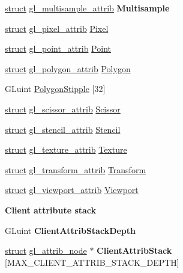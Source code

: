\begin{Indent}
\begin{DoxyCompactItemize}
\hyperlink{interfacestruct}{struct} \hyperlink{structgl__multisample__attrib}{gl\+\_\+multisample\+\_\+attrib} {\bfseries Multisample}
\item 
\hyperlink{interfacestruct}{struct} \hyperlink{structgl__pixel__attrib}{gl\+\_\+pixel\+\_\+attrib} \hyperlink{structgl__context_ac718578bc209874cb788abf0c41980ac}{Pixel}
\item 
\hyperlink{interfacestruct}{struct} \hyperlink{structgl__point__attrib}{gl\+\_\+point\+\_\+attrib} \hyperlink{structgl__context_a79d8f2f5bb031562f2136478c55fc249}{Point}
\item 
\hyperlink{interfacestruct}{struct} \hyperlink{structgl__polygon__attrib}{gl\+\_\+polygon\+\_\+attrib} \hyperlink{structgl__context_a49528675fd9c10af309a499891392aa4}{Polygon}
\item 
G\+Luint \hyperlink{structgl__context_af3af2af1154e6b8670f8d5076e299095}{Polygon\+Stipple} \mbox{[}32\mbox{]}
\item 
\hyperlink{interfacestruct}{struct} \hyperlink{structgl__scissor__attrib}{gl\+\_\+scissor\+\_\+attrib} \hyperlink{structgl__context_a8062e89ef2d80346927dfdba1147f3a0}{Scissor}
\item 
\hyperlink{interfacestruct}{struct} \hyperlink{structgl__stencil__attrib}{gl\+\_\+stencil\+\_\+attrib} \hyperlink{structgl__context_a95a893f6eb0f3b7a23d89db3b0a75c41}{Stencil}
\item 
\hyperlink{interfacestruct}{struct} \hyperlink{structgl__texture__attrib}{gl\+\_\+texture\+\_\+attrib} \hyperlink{structgl__context_aa3788eb53856dc78776e2ac6fb471804}{Texture}
\item 
\hyperlink{interfacestruct}{struct} \hyperlink{structgl__transform__attrib}{gl\+\_\+transform\+\_\+attrib} \hyperlink{structgl__context_a12d40ee4d766575386d7e25b03dd7db0}{Transform}
\item 
\hyperlink{interfacestruct}{struct} \hyperlink{structgl__viewport__attrib}{gl\+\_\+viewport\+\_\+attrib} \hyperlink{structgl__context_a54504b1734cbd90b1debe5c538b2ddeb}{Viewport}
\end{DoxyCompactItemize}
\end{Indent}
\begin{Indent}\textbf{ Client attribute stack}\par
\begin{DoxyCompactItemize}
\item 
\mbox{\label{structgl__context_a62bb2c6d35fa30046936ff2c7ad5ea1c}} 
G\+Luint {\bfseries Client\+Attrib\+Stack\+Depth}
\item 
\mbox{\label{structgl__context_ac2f2fe24baa26fb817bd98adb52d72bf}} 
\hyperlink{interfacestruct}{struct} \hyperlink{structgl__attrib__node}{gl\+\_\+attrib\+\_\+node} $\ast$ {\bfseries Client\+Attrib\+Stack} \mbox{[}M\+A\+X\+\_\+\+C\+L\+I\+E\+N\+T\+\_\+\+A\+T\+T\+R\+I\+B\+\_\+\+S\+T\+A\+C\+K\+\_\+\+D\+E\+P\+TH\mbox{]}
\end{DoxyCompactItemize}
\end{Indent}
